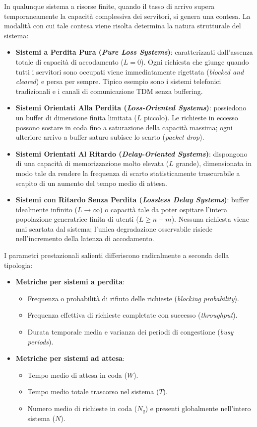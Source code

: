 \documentclass[11pt, a4paper]{article}
\begin{document}
In qualunque sistema a risorse finite, quando il tasso di arrivo supera temporaneamente la capacità complessiva dei servitori, si genera una contesa. La modalità con cui tale contesa viene risolta determina la natura strutturale del sistema:
\begin{itemize}[leftmargin=*]
    \item \textbf{Sistemi a Perdita Pura (\emph{Pure Loss Systems})}: caratterizzati dall'assenza totale di capacità di accodamento ($L = 0$). Ogni richiesta che giunge quando tutti i servitori sono occupati viene immediatamente rigettata (\emph{blocked and cleared}) e persa per sempre. Tipico esempio sono i sistemi telefonici tradizionali e i canali di comunicazione TDM senza buffering.
    \item \textbf{Sistemi Orientati Alla Perdita (\emph{Loss-Oriented Systems})}: possiedono un buffer di dimensione finita limitata ($L$ piccolo). Le richieste in eccesso possono sostare in coda fino a saturazione della capacità massima; ogni ulteriore arrivo a buffer saturo subisce lo scarto (\emph{packet drop}).
    \item \textbf{Sistemi Orientati Al Ritardo (\emph{Delay-Oriented Systems})}: dispongono di una capacità di memorizzazione molto elevata ($L$ grande), dimensionata in modo tale da rendere la frequenza di scarto statisticamente trascurabile a scapito di un aumento del tempo medio di attesa.
    \item \textbf{Sistemi con Ritardo Senza Perdita (\emph{Lossless Delay Systems})}: buffer idealmente infinito ($L \to \infty$) o capacità tale da poter ospitare l'intera popolazione generatrice finita di utenti ($L \ge n - m$). Nessuna richiesta viene mai scartata dal sistema; l'unica degradazione osservabile risiede nell'incremento della latenza di accodamento.
\end{itemize}

I parametri prestazionali salienti differiscono radicalmente a seconda della tipologia:
\begin{itemize}[leftmargin=*]
    \item \textbf{Metriche per sistemi a perdita}:
    \begin{itemize}
        \item Frequenza o probabilità di rifiuto delle richieste (\emph{blocking probability}).
        \item Frequenza effettiva di richieste completate con successo (\emph{throughput}).
        \item Durata temporale media e varianza dei periodi di congestione (\emph{busy periods}).
    \end{itemize}
    \item \textbf{Metriche per sistemi ad attesa}:
    \begin{itemize}
        \item Tempo medio di attesa in coda ($W$).
        \item Tempo medio totale trascorso nel sistema ($T$).
        \item Numero medio di richieste in coda ($N_q$) e presenti globalmente nell'intero sistema ($N$).
    \end{itemize}
\end{itemize}
\end{document}
